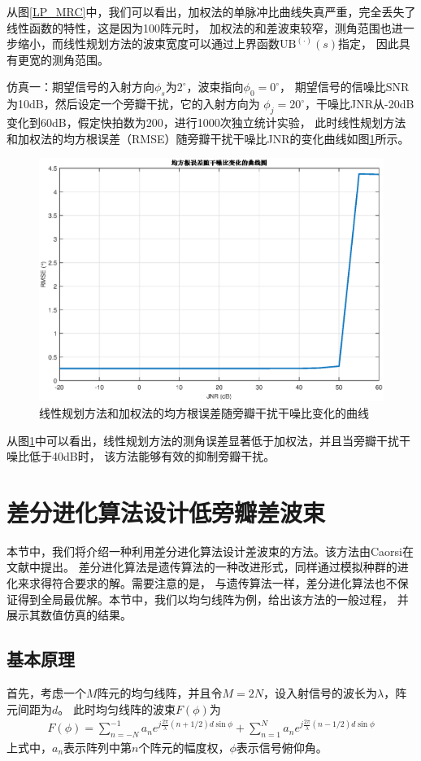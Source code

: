 \documentclass[master]{thesis-uestc}
\begin{document}
从图\ref{LP_MRC}中，我们可以看出，加权法的单脉冲比曲线失真严重，完全丢失了线性函数的特性，这是因为100阵元时，
加权法的和差波束较窄，测角范围也进一步缩小，而线性规划方法的波束宽度可以通过上界函数$\text{UB}^{(\cdot)}(s)$指定，
因此具有更宽的测角范围。

仿真一：期望信号的入射方向$\phi_s$为$2^\circ$，波束指向$\phi_0=0^\circ$，
期望信号的信噪比SNR为10dB，然后设定一个旁瓣干扰，它的入射方向为
$\phi_j=20^\circ$，干噪比JNR从-20dB变化到60dB，假定快拍数为200，进行1000次独立统计实验，
此时线性规划方法和加权法的均方根误差（RMSE）随旁瓣干扰干噪比JNR的变化曲线如图\ref{LP_RMSE_JNR}所示。
\begin{figure}[H]
    \includegraphics[scale=0.5]{pic/LP_RMSE_JNR.eps}
    \caption{线性规划方法和加权法的均方根误差随旁瓣干扰干噪比变化的曲线}
    \label{LP_RMSE_JNR}
\end{figure}

从图\ref{LP_RMSE_JNR}中可以看出，线性规划方法的测角误差显著低于加权法，并且当旁瓣干扰干噪比低于40dB时，
该方法能够有效的抑制旁瓣干扰。

\section{差分进化算法设计低旁瓣差波束}
本节中，我们将介绍一种利用差分进化算法设计差波束的方法。该方法由Caorsi在文献\cite{Caorsi}中提出。
差分进化算法是遗传算法的一种改进形式，同样通过模拟种群的进化来求得符合要求的解。需要注意的是，
与遗传算法一样，差分进化算法也不保证得到全局最优解。本节中，我们以均匀线阵为例，给出该方法的一般过程，
并展示其数值仿真的结果。

\subsection{基本原理}
首先，考虑一个$M$阵元的均匀线阵，并且令$M=2N$，设入射信号的波长为$\lambda$，阵元间距为$d$。
此时均匀线阵的波束$F(\phi)$为
\begin{equation}\label{de_pattern_fromula}
    \begin{aligned}
        F(\phi) = \sum_{n=-N}^{-1}a_ne^{j\frac{2\pi}{\lambda}\left(n+1/2\right)d\sin\phi} +
        \sum_{n=1}^{N}a_ne^{j\frac{2\pi}{\lambda}\left(n-1/2\right)d\sin\phi}
    \end{aligned}
\end{equation}
上式中，$a_n$表示阵列中第$n$个阵元的幅度权，$\phi$表示信号俯仰角。
\end{document}
